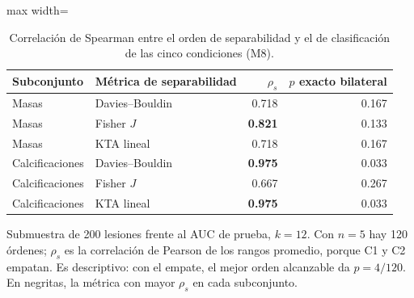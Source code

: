 \begin{table}[H]
\centering
\small
\caption{Correlación de Spearman entre el orden de separabilidad y el de clasificación de las cinco condiciones (M8).}
\label{tab:m8_spearman}
\begin{adjustbox}{max width=\linewidth}
\begin{tabular}{l l r r}
\toprule
Subconjunto & Métrica de separabilidad & $\rho_s$ & $p$ exacto bilateral \\
\midrule
Masas & Davies--Bouldin & 0.718 & 0.167 \\
Masas & Fisher $J$ & \textbf{0.821} & 0.133 \\
Masas & KTA lineal & 0.718 & 0.167 \\
Calcificaciones & Davies--Bouldin & \textbf{0.975} & 0.033 \\
Calcificaciones & Fisher $J$ & 0.667 & 0.267 \\
Calcificaciones & KTA lineal & \textbf{0.975} & 0.033 \\
\bottomrule
\end{tabular}
\end{adjustbox}
\par\smallskip
\parbox{0.95\linewidth}{\footnotesize Submuestra de 200 lesiones frente al AUC de prueba, $k = 12$. Con $n = 5$ hay 120 órdenes; $\rho_s$ es la correlación de Pearson de los rangos promedio, porque C1 y C2 empatan. Es descriptivo: con el empate, el mejor orden alcanzable da $p = 4/120$. En negritas, la métrica con mayor $\rho_s$ en cada subconjunto.}
\end{table}
